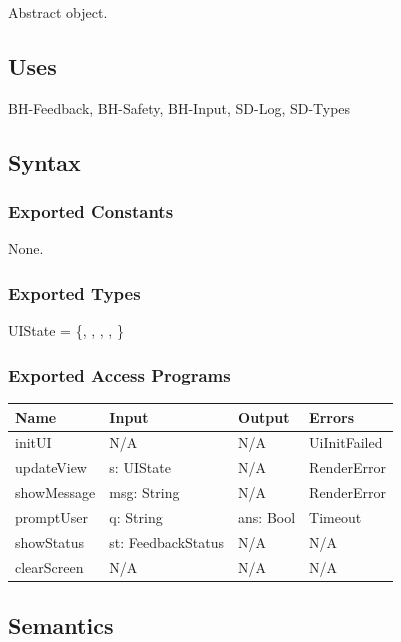 \documentclass[12pt, titlepage]{article}
\begin{document}
Abstract object.

\subsection{Uses}

BH-Feedback, BH-Safety, BH-Input, SD-Log, SD-Types

\subsection{Syntax}

\subsubsection{Exported Constants}

None.

\subsubsection{Exported Types}

\noindent UIState = \{, , ,
, \}

\subsubsection{Exported Access Programs}

\begin{center}
\begin{tabular}{p{2.7cm} p{4cm} p{4cm} p{2.5cm}}
\hline
\textbf{Name} & \textbf{Input} & \textbf{Output} & \textbf{Errors} \\
\hline
initUI & N/A & N/A & UiInitFailed \\
updateView & s: UIState & N/A & RenderError \\
showMessage & msg: String & N/A & RenderError \\
promptUser & q: String & ans: Bool & Timeout \\
showStatus & st: FeedbackStatus & N/A & N/A \\
clearScreen & N/A & N/A & N/A \\
\hline
\end{tabular}
\end{center}

\subsection{Semantics}
\end{document}
